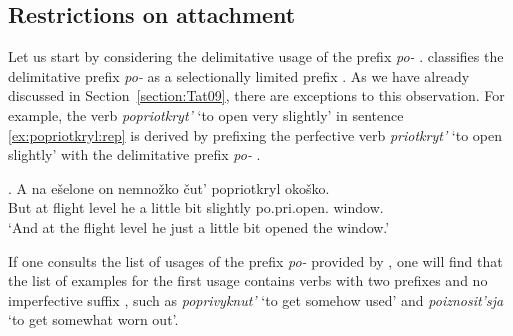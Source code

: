 \subsection{Restrictions on attachment} 
Let us start by considering the delimitative  usage of the prefix \textit{po-}  . \citet{Tatevosov:09} classifies the delimitative  prefix \textit{po-}   as a selectionally limited prefix . As we have already discussed in Section~\ref{section:Tat09}, there are exceptions to this observation. For example, the verb \textit{popriotkryt'} `to open very slightly' in sentence \ref{ex:popriotkryl:rep} is derived by prefixing the perfective verb  \textit{priotkryt'} `to open slightly' with the delimitative  prefix \textit{po-}  .

\exg. \label{ex:popriotkryl:rep}A na e\v{s}elone on nemno\v{z}ko \v{c}ut' popriotkryl oko\v{s}ko.\\
But at {flight level} he {a little bit} {slightly} po.pri.open. window.\\
\trans `And at the flight level he just a little bit opened the window.'\\

If one consults the list of usages of the prefix \textit{po-}   provided by \citet{Shvedova:82}, one will find that the list of examples for the first usage contains verbs with two prefixes and no imperfective suffix  , such as \textit{poprivyknut'} `to get somehow used' and \textit{poiznosit'sja} `to get somewhat worn out'. 


